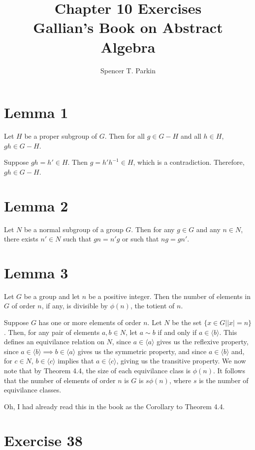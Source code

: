 \documentclass[12pt]{article}
\title{Chapter 10 Exercises\\Gallian's Book on Abstract Algebra}
\author{Spencer T. Parkin}
\begin{document}
\maketitle

\section*{Lemma 1}

Let $H$ be a proper subgroup of $G$.  Then
for all $g\in G-H$ and all $h\in H$, $gh\in G-H$.

Suppose $gh=h'\in H$.  Then $g=h'h^{-1}\in H$,
which is a contradiction.  Therefore, $gh\in G-H$.

\section*{Lemma 2}

Let $N$ be a normal subgroup of a group $G$.
Then for any $g\in G$ and any $n\in N$,
there exists $n'\in N$ such that $gn=n'g$ or such that $ng=gn'$.

\section*{Lemma 3}

Let $G$ be a group and let $n$ be a positive integer.
Then the number of elements in $G$ of order $n$, if any,
is divisible by $\phi(n)$, the totient of $n$.

Suppose $G$ has one or more elements of order $n$.
Let $N$ be the set $\{x\in G||x|=n\}$.  Then, for any pair
of elements $a,b\in N$, let $a\sim b$ if and only if $a\in\langle b\rangle$.
This defines an equivilance relation on $N$, since $a\in\langle a\rangle$ gives us
the reflexive property, since $a\in\langle b\rangle\implies b\in\langle a\rangle$ gives
us the symmetric property, and since $a\in\langle b\rangle$ and, for $c\in N$, $b\in\langle c\rangle$ implies
that $a\in\langle c\rangle$, giving us the transitive property.  We now note that
by Theorem 4.4, the size of each equivilance class is $\phi(n)$.
It follows that the number of elements of order $n$ is $G$ is
$s\phi(n)$, where $s$ is the number of equivilance classes.

Oh, I had already read this in the book as the Corollary to Theorem 4.4.

\section*{Exercise 38}
\end{document}

